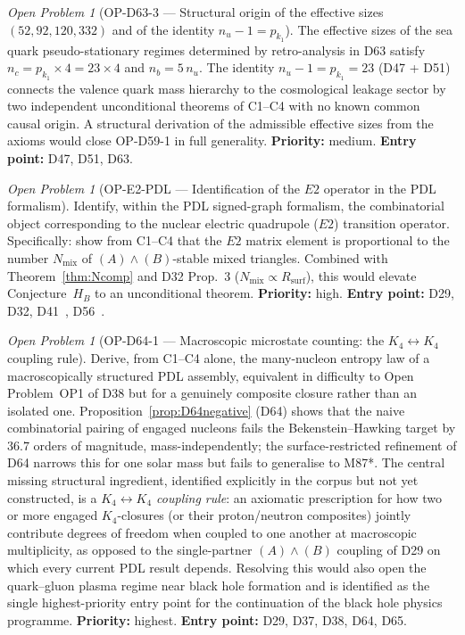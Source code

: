 \documentclass[11pt,a4paper]{article}
\theoremstyle{plain}
\theoremstyle{definition}
\theoremstyle{remark}
\newtheorem{openproblem}[theorem]{Open Problem}
\newcommand{\Kfour}{K_4}
\begin{document}
\begin{openproblem}[OP-D63-3 --- Structural origin of the effective sizes $(52, 92, 120, 332)$ and of the identity $n_u - 1 = p_{k_1}$]
\label{op:D63three}
The effective sizes of the sea quark pseudo-stationary regimes determined by retro-analysis in D63 satisfy $n_c = p_{k_1}\times 4 = 23\times 4$ and $n_b = 5\,n_u$. The identity $n_u - 1 = p_{k_1} = 23$ (D47 + D51) connects the valence quark mass hierarchy to the cosmological leakage sector by two independent unconditional theorems of C1--C4 with no known common causal origin. A structural derivation of the admissible effective sizes from the axioms would close OP-D59-1 in full generality. \textbf{Priority:} medium. \textbf{Entry point:} D47, D51, D63.
\end{openproblem}

\begin{openproblem}[OP-E2-PDL --- Identification of the $E2$ operator in the PDL formalism]
\label{op:E2PDL}
Identify, within the PDL signed-graph formalism, the combinatorial object corresponding to the nuclear electric quadrupole ($E2$) transition operator. Specifically: show from C1--C4 that the $E2$ matrix element is proportional to the number $N_{\mathrm{mix}}$ of $(A)\wedge(B)$-stable mixed triangles. Combined with Theorem~\ref{thm:Ncomp} and D32 Prop.~3 ($N_{\mathrm{mix}}\propto R_{\mathrm{surf}}$), this would elevate Conjecture~$H_B$ to an unconditional theorem. \textbf{Priority:} high. \textbf{Entry point:} D29, D32, D41~\cite{D41}, D56~\cite{D56}.
\end{openproblem}

\begin{openproblem}[OP-D64-1 --- Macroscopic microstate counting: the $K_4\leftrightarrow K_4$ coupling rule]
\label{op:D64one}
Derive, from C1--C4 alone, the many-nucleon entropy law of a macroscopically structured PDL assembly, equivalent in difficulty to Open Problem~OP1 of D38 but for a genuinely composite closure rather than an isolated one. Proposition~\ref{prop:D64negative} (D64) shows that the naive combinatorial pairing of engaged nucleons fails the Bekenstein--Hawking target by $36.7$ orders of magnitude, mass-independently; the surface-restricted refinement of D64 narrows this for one solar mass but fails to generalise to M87*. The central missing structural ingredient, identified explicitly in the corpus but not yet constructed, is a \emph{$K_4\leftrightarrow K_4$ coupling rule}: an axiomatic prescription for how two or more engaged $\Kfour$-closures (or their proton/neutron composites) jointly contribute degrees of freedom when coupled to one another at macroscopic multiplicity, as opposed to the single-partner $(A)\wedge(B)$ coupling of D29 on which every current PDL result depends. Resolving this would also open the quark--gluon plasma regime near black hole formation and is identified as the single highest-priority entry point for the continuation of the black hole physics programme. \textbf{Priority:} highest. \textbf{Entry point:} D29, D37, D38, D64, D65.
\end{openproblem}
\end{document}
